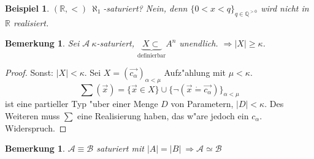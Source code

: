 \documentclass[a4paper,12pt,numbers=noenddot,parskip=full]{scrartcl}
\newcommand{\setQ}{\mathbb{Q}}
\newcommand{\setR}{\mathbb{R}}
\newcommand{\scrA}{\mathcal{A}}
\newcommand{\scrB}{\mathcal{B}}
\theoremstyle{dotless}
\newtheorem{example}[theorem]{Beispiel}
\newtheorem{remark}[theorem]{Bemerkung}
\begin{document}
\begin{example}
	$(\setR, <)~ \aleph_1$-saturiert? Nein, denn $\{0<x<q \}_{q \in \setQ^{>0}}$ wird nicht in $\setR$ realisiert.
\end{example}
\begin{remark}
	Sei $\scrA~ \kappa$-saturiert, $\underbrace{X \subset}_\text{definierbar} A^n$ unendlich. $\Longrightarrow |X| \geq \kappa$.
\end{remark}
\begin{proof}
	Sonst:  $|X| < \kappa$. Sei $X = (\vec{c_\alpha})_{\alpha<\mu}$ Aufz"ahlung mit $\mu < \kappa$. \begin{equation*}
		\sum(\vec{x}) = \{\vec{x} \in X \} \cup \{\lnot (\vec{x} \dot=\vec{c_\alpha}) \}_{\alpha<\mu}
	\end{equation*}
	ist eine partieller Typ "uber einer Menge $D$ von Parametern, $|D|< \kappa$. Des Weiteren muss $\sum$ eine Realisierung haben, das w"are jedoch ein $c_\alpha$. Widerspruch.
\end{proof}
\begin{remark}
	$\scrA \equiv \scrB$ saturiert mit $|A|=|B|~\Longrightarrow \scrA \simeq \scrB$
\end{remark}
\end{document}
